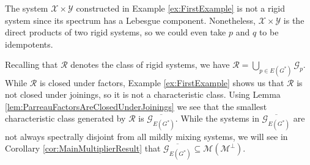 \documentclass[graybox]{svmult}
\theoremstyle{definition}
\begin{document}
\begin{remark}\label{rem:CharacteristicClosureOfRigid}
    The system $\mathcal X\times\mathcal Y$ constructed in Example \ref{ex:FirstExample} is not a rigid system since its spectrum has a Lebesgue component.
    Nonetheless, $\mathcal X\times\mathcal Y$ is the direct products of two rigid systems, so we could even take $p$ and $q$ to be idempotents.

    Recalling that $\mathcal{R}$ denotes the class of rigid systems, we have $\mathcal{R} = \bigcup_{p \in E(G^*)}\mathcal{G}_p$.
    While $\mathcal{R}$ is closed under factors, Example \ref{ex:FirstExample} shows us that $\mathcal{R}$ is not closed under joinings, so it is not a characteristic class.
    Using Lemma \ref{lem:ParreauFactorsAreClosedUnderJoinings} we see that the smallest characteristic class generated by $\mathcal{R}$ is $\overline{\mathcal{G}_{E(G^*)}}$.
    While the systems in $\overline{\mathcal{G}_{E(G^*)}}$ are not always spectrally disjoint from all mildly mixing systems, we will see in Corollary \ref{cor:MainMultiplierResult} that $\overline{\mathcal{G}_{E(G^*)}} \subseteq \mathscr{M}(\mathcal{M}^\perp)$. 
\end{remark}
\end{document}
